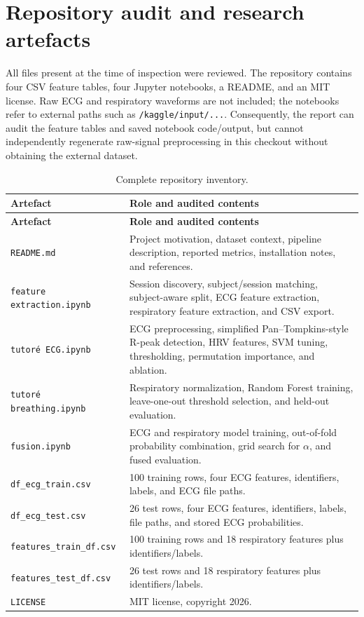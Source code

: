 \documentclass[11pt,a4paper]{article}
\begin{document}
\section{Repository audit and research artefacts}
All files present at the time of inspection were reviewed. The repository contains four CSV feature tables, four Jupyter notebooks, a README, and an MIT license. Raw ECG and respiratory waveforms are not included; the notebooks refer to external paths such as \texttt{/kaggle/input/...}. Consequently, the report can audit the feature tables and saved notebook code/output, but cannot independently regenerate raw-signal preprocessing in this checkout without obtaining the external dataset.

\begin{longtable}{p{}p{}}
\caption{Complete repository inventory.}\label{tab:inventory}\\
\toprule
\textbf{Artefact} & \textbf{Role and audited contents}\\
\midrule
\endfirsthead
\toprule
\textbf{Artefact} & \textbf{Role and audited contents}\\
\midrule
\endhead
\texttt{README.md} & Project motivation, dataset context, pipeline description, reported metrics, installation notes, and references.\\
\texttt{feature extraction.ipynb} & Session discovery, subject/session matching, subject-aware split, ECG feature extraction, respiratory feature extraction, and CSV export.\\
\texttt{tutoré ECG.ipynb} & ECG preprocessing, simplified Pan--Tompkins-style R-peak detection, HRV features, SVM tuning, thresholding, permutation importance, and ablation.\\
\texttt{tutoré breathing.ipynb} & Respiratory normalization, Random Forest training, leave-one-out threshold selection, and held-out evaluation.\\
\texttt{fusion.ipynb} & ECG and respiratory model training, out-of-fold probability combination, grid search for $\alpha$, and fused evaluation.\\
\texttt{df\_ecg\_train.csv} & 100 training rows, four ECG features, identifiers, labels, and ECG file paths.\\
\texttt{df\_ecg\_test.csv} & 26 test rows, four ECG features, identifiers, labels, file paths, and stored ECG probabilities.\\
\texttt{features\_train\_df.csv} & 100 training rows and 18 respiratory features plus identifiers/labels.\\
\texttt{features\_test\_df.csv} & 26 test rows and 18 respiratory features plus identifiers/labels.\\
\texttt{LICENSE} & MIT license, copyright 2026.\\
\bottomrule
\end{longtable}
\end{document}
